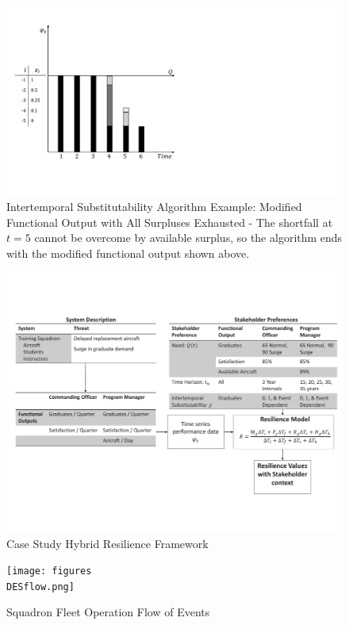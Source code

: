 \begin{figure}[h]
  \centering\includegraphics[width=\textwidth]{figures/Chi2-6.pdf}
  \caption{Intertemporal Substitutability Algorithm Example: Modified
    Functional Output with All Surpluses Exhausted - The shortfall at
    $t=5$ cannot be overcome by available surplus, so the algorithm
    ends with the modified functional output shown above.}
  \label{f:Chi2-6}
\end{figure}

\begin{figure}[h]
  \centering\includegraphics[width=\textwidth]{figures/FleetHybridModelDetailedEmb}
  \caption{Case Study Hybrid Resilience Framework}
  \label{f:FleetFramework}
\end{figure}

\begin{figure}[h]
  \centering\texttt{[image: figures\\DESflow.png]}
  \caption{Squadron Fleet Operation Flow of Events}
  \label{f:DESflow}
\end{figure}

